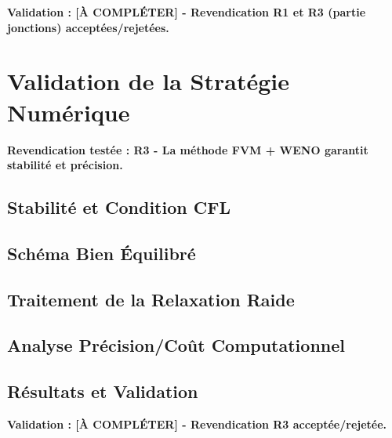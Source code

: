 \textbf{Validation : [À COMPLÉTER] - Revendication R1 et R3 (partie jonctions) acceptées/rejetées.}

\section{Validation de la Stratégie Numérique}
\label{sec:validation_numerique}

\textbf{Revendication testée : R3 - La méthode FVM + WENO garantit stabilité et précision.}

\subsection{Stabilité et Condition CFL}
\label{subsec:stabilite_cfl}

\subsection{Schéma Bien Équilibré}
\label{subsec:schema_equilibre}

\subsection{Traitement de la Relaxation Raide}
\label{subsec:relaxation_raide}

\subsection{Analyse Précision/Coût Computationnel}
\label{subsec:precision_cout}

\subsection{Résultats et Validation}
\label{subsec:resultats_numerique}

\textbf{Validation : [À COMPLÉTER] - Revendication R3 acceptée/rejetée.}

